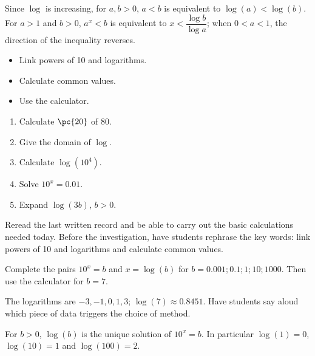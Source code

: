 Since $\log$ is increasing, for $a,b>0$, $a<b$ is equivalent to $\log(a)<\log(b)$. For $a>1$ and $b>0$, $a^x<b$ is equivalent to $x<\dfrac{\log b}{\log a}$; when $0<a<1$, the direction of the inequality reverses.

\begin{objectives}\begin{itemize}\item Link powers of 10 and logarithms.\item Calculate common values.\item Use the calculator.\end{itemize}\end{objectives}
\begin{fluency}\begin{enumerate}\item Calculate $\pc{20}$ of $80$. \item Give the domain of $\log$. \mxblank{$]0,+\infty[$}\item Calculate $\log(10^4)$. \item Solve $10^x=\num{0,01}$. \item Expand $\log(3b)$, $b>0$. \end{enumerate}\end{fluency}
\begin{prerequisites}Reread the last written record and be able to carry out the basic calculations needed today. Before the investigation, have students rephrase the key words: link powers of 10 and logarithms and calculate common values.\end{prerequisites}

\begin{activity}
Complete the pairs $10^x=b$ and $x=\log(b)$ for $b=\num{0,001};\num{0,1};1;10;\num{1000}$. Then use the calculator for $b=7$.

\end{activity}
\begin{solution}The logarithms are $-3,-1,0,1,3$; $\log(7)\approx\num{0,8451}$. Have students say aloud which piece of data triggers the choice of method.\end{solution}

\begin{summary}For $b>0$, $\log(b)$ is the unique solution of $10^x=b$. In particular $\log(1)=0$, $\log(10)=1$ and $\log(100)=2$.\end{summary}

